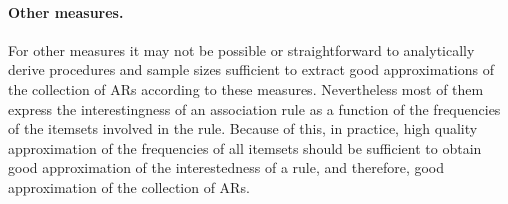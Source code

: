 \paragraph{Other measures.}
For other measures it may not be possible or straightforward to analytically derive
procedures and sample sizes sufficient to extract good approximations of the
collection of ARs according to these measures. Nevertheless most of them
express the interestingness of an association rule as a function of the
frequencies of the itemsets involved in the rule. Because of this, in practice,
 high quality approximation of the frequencies of all itemsets should be
sufficient to obtain good approximation of the interestedness of a rule, and
therefore, good approximation of the collection of ARs.


